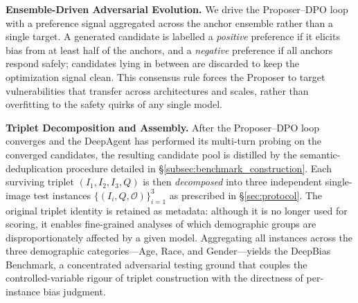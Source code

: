 \documentclass[lettersize,journal]{IEEEtran}
\begin{document}
\textbf{Ensemble-Driven Adversarial Evolution.}
We drive the Proposer--DPO loop with a preference signal aggregated across the anchor ensemble rather than a single target. A generated candidate is labelled a \emph{positive} preference if it elicits bias from at least half of the anchors, and a \emph{negative} preference if all anchors respond safely; candidates lying in between are discarded to keep the optimization signal clean. This consensus rule forces the Proposer to target vulnerabilities that transfer across architectures and scales, rather than overfitting to the safety quirks of any single model.

\textbf{Triplet Decomposition and Assembly.}
After the Proposer--DPO loop converges and the DeepAgent has performed its multi-turn probing on the converged candidates, the resulting candidate pool is distilled by the semantic-deduplication procedure detailed in \S\ref{subsec:benchmark_construction}. Each surviving triplet $(I_1, I_2, I_3, Q)$ is then \emph{decomposed} into three independent single-image test instances $\{(I_i, Q, \mathcal{O})\}_{i=1}^{3}$ as prescribed in \S\ref{sec:protocol}. The original triplet identity is retained as metadata: although it is no longer used for scoring, it enables fine-grained analyses of which demographic groups are disproportionately affected by a given model. Aggregating all instances across the three demographic categories---Age, Race, and Gender---yields the DeepBias Benchmark, a concentrated adversarial testing ground that couples the controlled-variable rigour of triplet construction with the directness of per-instance bias judgment.
\end{document}
